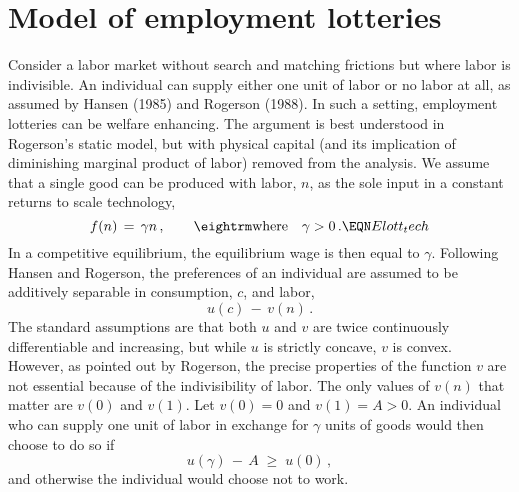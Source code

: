 \section{Model of employment lotteries}\label{Empl_lottery}%
Consider a labor market without search and matching frictions but
where labor is indivisible. An individual can supply either
one unit of labor or no labor at all, as assumed by Hansen (1985)
and Rogerson (1988).
%
In such a setting, employment lotteries can
be welfare enhancing. The argument is best understood in
Rogerson's static model, but with physical capital (and its
implication of diminishing marginal product of labor)
removed from the analysis.  We assume that a single good
can be produced with labor, $n$, as the sole input in a
constant returns to scale technology,
$$
f(n) \,=\, \gamma n\,,  \qquad \hbox{\rm where} \quad \gamma >0\,.  \EQN Elott_tech
$$
In a competitive equilibrium, the equilibrium wage is then equal to
$\gamma$.
Following Hansen and Rogerson, the preferences of an individual
are assumed to be additively separable in consumption, $c$, and labor,
$$
u(c) \,-\, v(n)\,.
$$
The standard assumptions are that both $u$ and $v$ are twice continuously
differentiable and increasing, but while $u$ is strictly concave,
$v$ is convex. However, as pointed out by Rogerson, the precise
properties of the function $v$ are not essential because of the
indivisibility of labor. The only values of $v(n)$ that matter
are $v(0)$ and $v(1)$. Let $v(0)=0$
and $v(1)=A>0$. An individual who can supply one unit of labor
in exchange for $\gamma$ units of goods would then choose to do
so if
$$
u(\gamma) \,-\, A \;\geq\; u(0)\,,
$$
and otherwise the individual would choose not to work.


